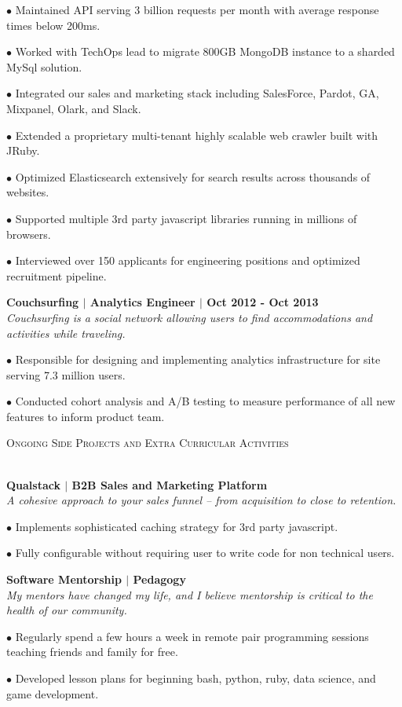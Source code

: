 \documentclass{article}
\newcommand{\lineunder}{\vspace*{-8pt} \\ \hspace*{-18pt} \hrulefill \\}
\newcommand{\header}[1]{{\hspace*{-15pt}\vspace*{6pt} \textsc{#1}} \vspace*{-6pt} \lineunder}
\begin{document}
\begin{description}
	 \item$\bullet$ Maintained API serving 3 billion requests per month with average response times below 200ms.
	 \item$\bullet$ Worked with TechOps lead to migrate 800GB MongoDB instance to a sharded MySql solution.
	 \item$\bullet$ Integrated our sales and marketing stack including SalesForce, Pardot, GA, Mixpanel, Olark, and Slack.
	 \item$\bullet$ Extended a proprietary multi-tenant highly scalable web crawler built with JRuby.
	 \item$\bullet$ Optimized Elasticsearch extensively for search results across thousands of websites.
	 \item$\bullet$ Supported multiple 3rd party javascript libraries running in millions of browsers.
	 \item$\bullet$ Interviewed over 150 applicants for engineering positions and optimized recruitment pipeline. 
	
	 \item \textbf{Couchsurfing $|$ Analytics Engineer $|$ Oct 2012 - Oct 2013} \\
	  \textit{Couchsurfing is a social network allowing users to find accommodations and activities while traveling.}
	 \item$\bullet$ Responsible for designing and implementing analytics infrastructure for site serving 7.3 million users.
	 \item$\bullet$ Conducted cohort analysis and A/B testing to measure performance of all new features to inform product team.
	 
	 
	\end{description}

\header{Ongoing Side Projects and Extra Curricular Activities}

\begin{description}

 \item \textbf{Qualstack $|$ B2B Sales and Marketing Platform } \\
 \textit{A cohesive approach to your sales funnel -- from acquisition to close to retention.}
 \item$\bullet$ Implements sophisticated caching strategy for 3rd party javascript.   
 \item$\bullet$ Fully configurable without requiring user to write code for non technical users.


 \item \textbf{Software Mentorship $|$ Pedagogy } \\
 \textit{My mentors have changed my life, and I believe mentorship is critical to the health of our community. }  
 \item$\bullet$ Regularly spend a few hours a week in remote pair programming sessions teaching friends and family for free.
 \item$\bullet$ Developed lesson plans for beginning bash, python, ruby, data science, and game development.
 

 
\end{description}
\end{document}
